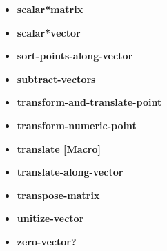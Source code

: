 \documentclass [11pt]{book}
\begin{document}
\begin{itemize}
\item {}
\label{prim:scalar*matrix}
\textbf{scalar*matrix}





\item {}
\label{prim:scalar*vector}
\textbf{scalar*vector}





\item {}
\label{prim:sort-points-along-vector}
\textbf{sort-points-along-vector}





\item {}
\label{prim:subtract-vectors}
\textbf{subtract-vectors}





\item {}
\label{prim:transform-and-translate-point}
\textbf{transform-and-translate-point}





\item {}
\label{prim:transform-numeric-point}
\textbf{transform-numeric-point}





\item {}
\label{prim:translate}
\textbf{translate [Macro]}





\item {}
\label{prim:translate-along-vector}
\textbf{translate-along-vector}





\item {}
\label{prim:transpose-matrix}
\textbf{transpose-matrix}





\item {}
\label{prim:unitize-vector}
\textbf{unitize-vector}





\item {}
\label{prim:zero-vector?}
\textbf{zero-vector?}





\end{itemize}
\end{document}
